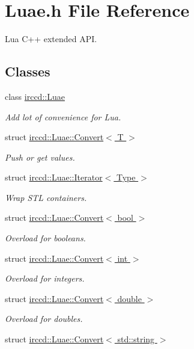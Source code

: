 \hypertarget{a00089}{\section{Luae.\-h File Reference}
\label{a00089}
}


Lua C++ extended A\-P\-I.  


\subsection*{Classes}
\begin{DoxyCompactItemize}
\item 
class \hyperlink{a00040}{irccd\-::\-Luae}
\begin{DoxyCompactList}\small\item\em Add lot of convenience for Lua. \end{DoxyCompactList}\item 
struct \hyperlink{a00007}{irccd\-::\-Luae\-::\-Convert$<$ T $>$}
\begin{DoxyCompactList}\small\item\em Push or get values. \end{DoxyCompactList}\item 
struct \hyperlink{a00037}{irccd\-::\-Luae\-::\-Iterator$<$ Type $>$}
\begin{DoxyCompactList}\small\item\em Wrap S\-T\-L containers. \end{DoxyCompactList}\item 
struct \hyperlink{a00008}{irccd\-::\-Luae\-::\-Convert$<$ bool $>$}
\begin{DoxyCompactList}\small\item\em Overload for booleans. \end{DoxyCompactList}\item 
struct \hyperlink{a00011}{irccd\-::\-Luae\-::\-Convert$<$ int $>$}
\begin{DoxyCompactList}\small\item\em Overload for integers. \end{DoxyCompactList}\item 
struct \hyperlink{a00010}{irccd\-::\-Luae\-::\-Convert$<$ double $>$}
\begin{DoxyCompactList}\small\item\em Overload for doubles. \end{DoxyCompactList}\item 
struct \hyperlink{a00015}{irccd\-::\-Luae\-::\-Convert$<$ std\-::string $>$}

\end{DoxyCompactItemize}
